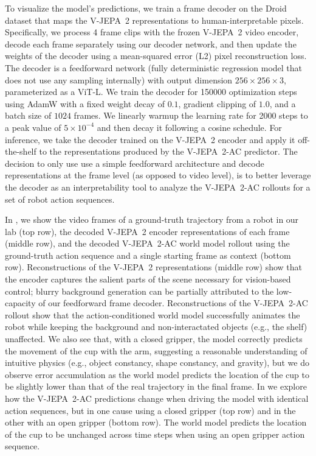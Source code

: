 \documentclass[]{fairmeta}
\newcommand{\model}{V-JEPA~2\xspace}
\newcommand{\acModel}{V-JEPA~2-AC\xspace}
\begin{document}
To visualize the model's predictions, we train a frame decoder on the Droid dataset that maps the \model representations to human-interpretable pixels.
Specifically, we process 4 frame clips with the frozen \model video encoder,  decode each frame separately using our decoder network, and then update the weights of the decoder using a mean-squared error (L2) pixel reconstruction loss.
The decoder is a feedforward network (fully deterministic regression model that does not use any sampling internally) with output dimension $256 \times 256 \times 3$, parameterized as a ViT-L.
We train the decoder for 150000 optimization steps using AdamW with a fixed weight decay of $0.1$, gradient clipping of $1.0$, and a batch size of $1024$ frames.
We linearly warmup the learning rate for 2000 steps to a peak value of $5 \times 10^{-4}$ and then decay it following a cosine schedule.
For inference, we take the decoder trained on the \model encoder and apply it off-the-shelf to the representations produced by the \acModel predictor.
The decision to only use use a simple feedforward architecture and decode representations at the frame level (as opposed to video level), is to better leverage the decoder as an interpretability tool to analyze the  \acModel rollouts for a set of robot action sequences.


In , we show the video frames of a ground-truth trajectory from a robot in our lab (top row), the decoded \model encoder representations of each frame (middle row), and the decoded \acModel world model rollout using the ground-truth action sequence and a single starting frame as context (bottom row).
Reconstructions of the \model representations (middle row) show that the encoder captures the salient parts of the scene necessary for vision-based control; blurry background generation can be partially attributed to the low-capacity of our feedforward frame decoder.
Reconstructions of the \acModel rollout show that the action-conditioned world model successfully animates the robot while keeping the background and non-interactated objects (e.g., the shelf) unaffected.
We also see that, with a closed gripper, the model correctly predicts the movement of the cup with the arm, suggesting a reasonable understanding of intuitive physics (e.g., object constancy, shape constancy, and gravity), but we do observe error accumulation as the world model predicts the location of the cup to be slightly lower than that of the real trajectory in the final frame.
In  we explore how the \acModel predictions change when driving the model with identical action sequences, but in one cause using a closed gripper (top row) and in the other with an open gripper (bottom row).
The world model predicts the location of the cup to be unchanged across time steps when using an open gripper action sequence.
\end{document}
